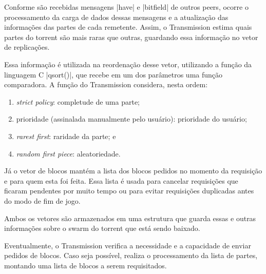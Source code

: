 
Conforme são recebidas mensagens \bverb|have| e \bverb|bitfield| de outros \glspl*{peer},
ocorre o processamento da carga de dados dessas mensagens e a atualização das
informações das partes de cada remetente. Assim, o Transmission estima quais partes do
\gls*{torrent} são mais raras que outras, guardando essa informação no vetor de
replicações.


Essa informação é utilizada na reordenação desse vetor, utilizando a função da linguagem
C \sverb|qsort()|, que recebe em um dos parâmetros uma função comparadora. A função do
Transmission considera, nesta ordem:

\begin{enumerate}
    \item \emph{strict policy}: completude de uma parte;
    \item prioridade (assinalada manualmente pelo usuário): prioridade do usuário;
    \item \emph{rarest first}: raridade da parte; e
    \item \emph{random first piece}: aleatoriedade.
\end{enumerate}


Já o vetor de blocos mantém a lista dos blocos pedidos no momento da requisição e para
quem esta foi feita. Essa lista é usada para cancelar requisições que ficaram pendentes
por muito tempo ou para evitar requisições duplicadas antes do modo de fim de jogo.


Ambos os vetores são armazenados em uma estrutura que guarda essas e outras informações
sobre o \gls*{swarm} do \gls*{torrent} que está sendo baixado.


Eventualmente, o Transmission verifica a necessidade e a capacidade de enviar pedidos
de blocos. Caso seja possível, realiza o processamento da lista de partes, montando uma
lista de blocos a serem requisitados.

\newpage
{}

